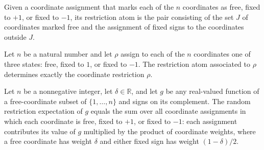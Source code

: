 \begin{definition}
\label{FABL.restrictionAtomOfAssignment}
\leanok
{}
Given a coordinate assignment that marks each of the $n$ coordinates as free, fixed to
$+1$, or fixed to $-1$, its restriction atom is the pair consisting of the set $J$ of
coordinates marked free and the assignment of fixed signs to the coordinates outside
$J$.
\end{definition}

\begin{theorem}
\label{FABL.coordRestrictionOf_restrictionAtomOfAssignment}
\leanok
{}
Let $n$ be a natural number and let $\rho$ assign to each of the $n$ coordinates one of
three states: free, fixed to $1$, or fixed to $-1$. The restriction atom associated to
$\rho$ determines exactly the coordinate restriction $\rho$.
\end{theorem}

\begin{theorem}
\label{FABL.expectRandomRestriction_eq_sum_assignment}
\leanok
{}
Let $n$ be a nonnegative integer, let $\delta\in\mathbb R$, and let $g$ be any
real-valued function of a free-coordinate subset of $\{1,\ldots,n\}$ and signs on its
complement. The random restriction expectation of $g$ equals the sum over all coordinate
assignments in which each coordinate is free, fixed to $+1$, or fixed to $-1$: each
assignment contributes its value of $g$ multiplied by the product of coordinate weights,
where a free coordinate has weight $\delta$ and either fixed sign has weight
$(1-\delta)/2$.
\end{theorem}

